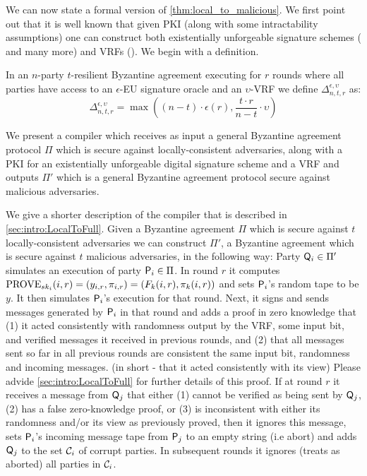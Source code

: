We can now state a formal version of \cref{thm:local_to_malicious}. We first point out that it is well known that given PKI (along with some intractability assumptions) one can construct both existentially unforgeable signature schemes (\cite{RSA78, Merkle89, Rabin1979} and many more) and VRFs (\cite{DY05}).  We begin with a definition.
\newcommand{\euval}{(n-t)\cdot \epsilon(r)}
\newcommand{\vrfval}{\frac{t\cdot r}{n-t}\cdot \upsilon}
\newcommand{\rnd}{\Delta^{\epsilon,\upsilon}_{n,t,r}}

\begin{definition}[$\rnd$]
	In an $n$-party $t$-resilient Byzantine agreement executing for $r$ rounds where all parties have access to an $\epsilon$-EU signature oracle and an $\upsilon$-VRF we define $\rnd$ as:
	\[
	\rnd = \max(\euval, \vrfval)
	\]
\end{definition}

We present a compiler which receives as input a general Byzantine agreement protocol $\Pi$ which is secure against locally-consistent adversaries, along with a PKI for an existentially unforgeable digital signature scheme and a VRF and outputs $\Pi'$ which is a general Byzantine agreement protocol secure against malicious adversaries.

We give a shorter description  of the compiler that is described in \cref{sec:intro:LocalToFull}. Given a Byzantine agreement $\Pi$ which is secure against $t$ locally-consistent adversaries we can construct $\Pi'$, a Byzantine agreement which is secure against $t$ malicious adversaries, in the following way: Party $\mathsf{Q}_i \in \Pi'$ simulates an execution of party $\mathsf{P}_i \in \Pi$. In round $r$ it computes $\text{PROVE}_{sk_i}(i,r) = (y_{i,r},\pi_{i,r}) = (F_k(i,r), \pi_k(i,r)) $ and sets $\mathsf{P}_i$'s random tape to be $y$. It then simulates $\mathsf{P}_i$'s execution for that round. Next, it signs and sends messages generated by $\mathsf{P}_i$ in that round and adds a proof in zero knowledge that (1) it acted consistently with randomness output by the VRF, some input bit, and verified messages it received in previous rounds, and (2) that all messages sent so far in all previous rounds are consistent \wrt the same input bit, randomness and incoming messages. (in short - that it acted consistently with its view) Please advide \cref{sec:intro:LocalToFull} for further details of this proof. If at round $r$ it receives a message from $\mathsf{Q}_j$ that either (1) cannot be verified as being sent by $\mathsf{Q}_j$, (2) has a false zero-knowledge proof, or (3) is inconsistent with either its randomness and/or its view as previously proved, then it ignores this message, sets $\mathsf{P}_i$'s incoming message tape from $\mathsf{P}_j$ to an empty string (i.e abort) and adds $\mathsf{Q}_j$ to the set $\mathcal{C}_i$ of corrupt parties. In subsequent rounds it ignores (\ie treats as aborted) all parties in $\mathcal{C}_i$.


